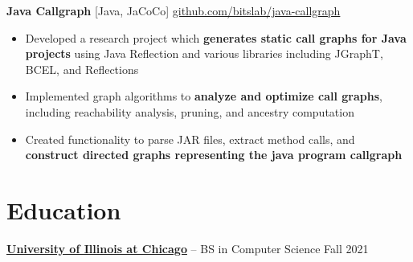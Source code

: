 \documentclass[11pt]{article}
\begin{document}
\textbf{Java Callgraph} [Java, JaCoCo] \hfill \href{https://github.com/bitslab/java-callgraph}{github.com/bitslab/java-callgraph} \\
\vspace{-9pt}
\begin{itemize}

  \item Developed a research project which \textbf{generates static call graphs for Java projects} using Java Reflection and various libraries including JGraphT, BCEL, and Reflections
  \item Implemented graph algorithms to \textbf{analyze and optimize call graphs}, including reachability analysis, pruning, and ancestry computation
  \item Created functionality to parse JAR files, extract method calls, and \textbf{construct directed graphs representing the java program callgraph}

\end{itemize}

\vspace{-18.5pt}

\section*{Education}
\textbf{\href{https://www.uic.edu/}{University of Illinois at Chicago}} -- BS in Computer Science \hfill Fall 2021
\end{document}

